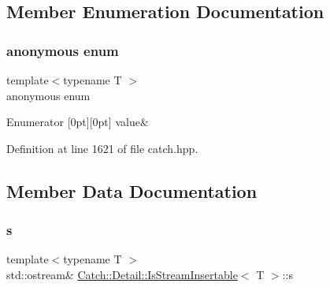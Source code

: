 \subsection{Member Enumeration Documentation}
\hypertarget{struct_catch_1_1_detail_1_1_is_stream_insertable_a2e4508694da3bf368ff67733a7970edd}{}\label{struct_catch_1_1_detail_1_1_is_stream_insertable_a2e4508694da3bf368ff67733a7970edd} 
\subsubsection{\texorpdfstring{anonymous enum}{anonymous enum}}
{\footnotesize\ttfamily template$<$typename T $>$ \\
anonymous enum}

\begin{DoxyEnumFields}{Enumerator}
[0pt][0pt]{}\hypertarget{struct_catch_1_1_detail_1_1_is_stream_insertable_a2e4508694da3bf368ff67733a7970edda765a324929702bfce2969fc19fc4f926}{}\label{struct_catch_1_1_detail_1_1_is_stream_insertable_a2e4508694da3bf368ff67733a7970edda765a324929702bfce2969fc19fc4f926} 
value&\\
\hline

\end{DoxyEnumFields}


Definition at line 1621 of file catch.\+hpp.



\subsection{Member Data Documentation}
\hypertarget{struct_catch_1_1_detail_1_1_is_stream_insertable_abe3d3c8e5d85665747faafffc9a96b00}{}\label{struct_catch_1_1_detail_1_1_is_stream_insertable_abe3d3c8e5d85665747faafffc9a96b00} 
\subsubsection{\texorpdfstring{s}{s}}
{\footnotesize\ttfamily template$<$typename T $>$ \\
std\+::ostream\& \hyperlink{struct_catch_1_1_detail_1_1_is_stream_insertable}{Catch\+::\+Detail\+::\+Is\+Stream\+Insertable}$<$ T $>$\+::s\hspace{0.3cm}{\ttfamily [static]}}



